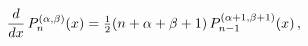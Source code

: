 \[\frac{d}{dx}\mathop{P^{(\alpha,\beta)}_{n}\/}\nolimits\!\left(x\right)=\tfrac{%
1}{2}(n+\alpha+\beta+1)\mathop{P^{(\alpha+1,\beta+1)}_{n-1}\/}\nolimits\!\left%
(x\right),\]